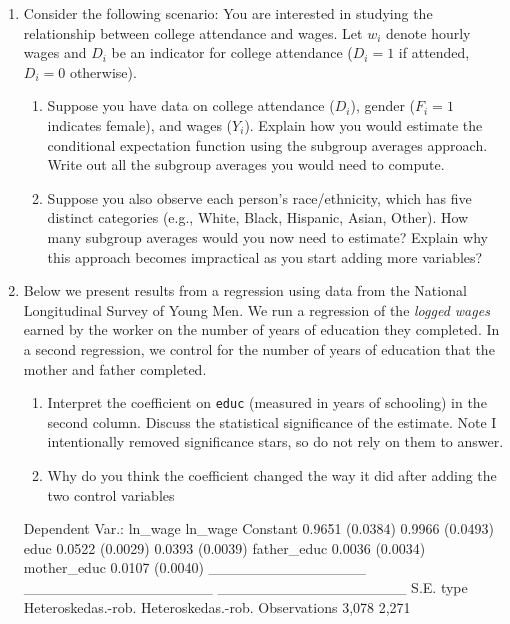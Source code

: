 \documentclass[12pt]{article}
\begin{document}
\begin{enumerate}
    \newpage
  \item Consider the following scenario: You are interested in studying the relationship
    between college attendance and wages. Let $w_i$ denote hourly wages and $D_i$ be an
    indicator for college attendance ($D_i=1$ if attended, $D_i=0$ otherwise).

    \begin{enumerate}
      \item Suppose you have data on college attendance ($D_i$), gender ($F_i=1$ indicates female), and wages ($Y_i$). 
      Explain how you would estimate the conditional expectation function using the subgroup averages approach.
      Write out all the subgroup averages you would need to compute.

      \item Suppose you also observe each person's race/ethnicity, which has five
        distinct categories (e.g., White, Black, Hispanic, Asian, Other). How many
        subgroup averages would you now need to estimate?
        Explain why this approach becomes impractical as you start adding more variables?
    \end{enumerate}

    \bigskip
  \item Below we present results from a regression using data from the National Longitudinal Survey of Young Men.
    We run a regression of the \emph{logged wages} earned by the worker on the number of years of education they completed.
    In a second regression, we control for the number of years of education that the mother and father completed.
    \begin{enumerate}
      \item Interpret the coefficient on \texttt{educ} (measured in years of schooling) in the second column.
        Discuss the statistical significance of the estimate.
        Note I intentionally removed significance stars, so do not rely on them to answer.

      \item Why do you think the coefficient changed the way it did after adding the two control variables
    \end{enumerate}

    \begin{codeblock}[{}]
Dependent Var.:            ln_wage              ln_wage
Constant           0.9651 (0.0384)      0.9966 (0.0493)
educ               0.0522 (0.0029)      0.0393 (0.0039)
father_educ                             0.0036 (0.0034)
mother_educ                             0.0107 (0.0040)
_______________ __________________   __________________
S.E. type       Heteroskedas.-rob.   Heteroskedas.-rob.
Observations                 3,078                2,271
    \end{codeblock}

\end{enumerate}
\end{document}
